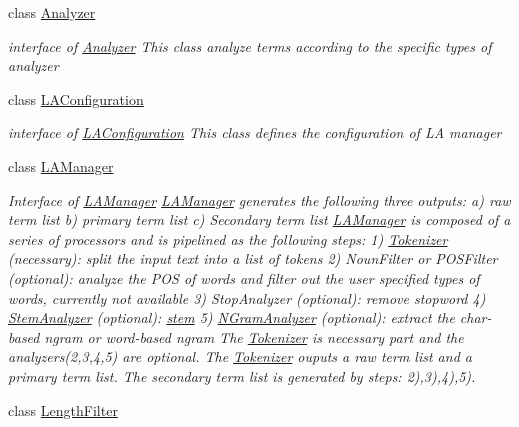 \begin{CompactItemize}
\item 
class \hyperlink{classla__manager_1_1Analyzer}{Analyzer}
\begin{CompactList}\small\item\em interface of \hyperlink{classla__manager_1_1Analyzer}{Analyzer} This class analyze terms according to the specific types of analyzer \item\end{CompactList}\item 
class \hyperlink{classla__manager_1_1LAConfiguration}{LAConfiguration}
\begin{CompactList}\small\item\em interface of \hyperlink{classla__manager_1_1LAConfiguration}{LAConfiguration} This class defines the configuration of LA manager \item\end{CompactList}\item 
class \hyperlink{classla__manager_1_1LAManager}{LAManager}
\begin{CompactList}\small\item\em Interface of \hyperlink{classla__manager_1_1LAManager}{LAManager} \hyperlink{classla__manager_1_1LAManager}{LAManager} generates the following three outputs: a) raw term list b) primary term list c) Secondary term list \hyperlink{classla__manager_1_1LAManager}{LAManager} is composed of a series of processors and is pipelined as the following steps: 1) \hyperlink{classla__manager_1_1Tokenizer}{Tokenizer} (necessary): split the input text into a list of tokens 2) NounFilter or POSFilter (optional): analyze the POS of words and filter out the user specified types of words, currently not available 3) StopAnalyzer (optional): remove stopword 4) \hyperlink{classla__manager_1_1StemAnalyzer}{StemAnalyzer} (optional): \hyperlink{namespacela__manager_1_1stem}{stem} 5) \hyperlink{classla__manager_1_1NGramAnalyzer}{NGramAnalyzer} (optional): extract the char-based ngram or word-based ngram The \hyperlink{classla__manager_1_1Tokenizer}{Tokenizer} is necessary part and the analyzers(2,3,4,5) are optional. The \hyperlink{classla__manager_1_1Tokenizer}{Tokenizer} ouputs a raw term list and a primary term list. The secondary term list is generated by steps: 2),3),4),5). \item\end{CompactList}\item 
class \hyperlink{classla__manager_1_1LengthFilter}{LengthFilter}
\item 

\end{CompactItemize}
